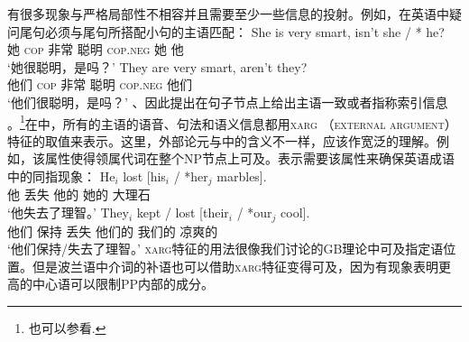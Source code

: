 有很多现象与严格局部性不相容并且需要至少一些信息的投射。例如，在英语中疑问尾句必须与尾句所搭配小句的主语匹配：
\eal
\ex 
\gll She is very smart, isn't she / * he?\\
     她 \textsc{cop} 非常 聪明 \textsc{cop}.\textsc{neg} 她 {} {} 他\\
\glt `她很聪明，是吗？'
\ex 
\gll They are very smart, aren't they?\\
     他们 \textsc{cop} 非常 聪明 \textsc{cop}.\textsc{neg} 他们\\
\glt `他们很聪明，是吗？'
\zl
\citet{BF99a}、\citet{FB2003a}因此提出在句子节点上给出主语一致或者指称索引信息 。\footnote{%
  也可以参看.
}在\citet{Sag2007a}中，所有的主语的语音、句法和语义信息都用\textsc{xarg} （\textsc{external argument}）特征的取值来表示。这里，外部论元与\gbtc 中的含义不一样，应该作宽泛的理解。例如，该属性使得领属代词在整个NP节点上可及。\citet{Sag2007a}表示需要该属性来确保英语成语中的同指现象：
\eal
\ex 
\gll He$_i$ lost [his$_i$ / *her$_j$ marbles].\\
     他      丢失 \spacebr{}他的 {} 她的 大理石\\
\glt `他失去了理智。'
\ex 
\gll They$_i$ kept / lost [their$_i$ / *our$_j$ cool].\\
     他们     保持  {} 丢失 \spacebr{}他们的 {} 我们的 凉爽的\\
\glt `他们保持/失去了理智。'
\zl
\textsc{xarg}特征的用法很像我们讨论的GB理论中可及指定语位置。但是波兰语中介词的补语也可以借助\textsc{xarg}特征变得可及，因为有现象表明更高的中心语可以限制PP内部的成分\citep[\S~5.4.1.2]{Prze99b}。


